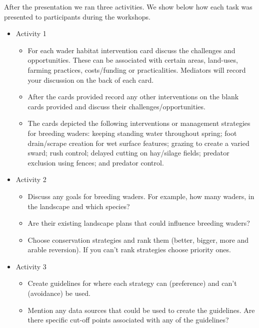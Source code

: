 \documentclass[
  12pt,
  letterpaper,
  DIV=11,
  numbers=noendperiod]{scrartcl}
\providecommand{\tightlist}{%
  \setlength{\itemsep}{0pt}\setlength{\parskip}{0pt}}\usepackage{longtable,booktabs,array}
\begin{document}
After the presentation we ran three activities. We show below how each
task was presented to participants during the workshops.

\begin{itemize}
\tightlist
\item
  Activity 1

  \begin{itemize}
  \tightlist
  \item
    For each wader habitat intervention card discuss the challenges and
    opportunities. These can be associated with certain areas,
    land-uses, farming practices, costs/funding or practicalities.
    Mediators will record your discussion on the back of each card.
  \item
    After the cards provided record any other interventions on the blank
    cards provided and discuss their challenges/opportunities.
  \item
    The cards depicted the following interventions or management
    strategies for breeding waders: keeping standing water throughout
    spring; foot drain/scrape creation for wet surface features; grazing
    to create a varied sward; rush control; delayed cutting on
    hay/silage fields; predator exclusion using fences; and predator
    control.
  \end{itemize}
\item
  Activity 2

  \begin{itemize}
  \tightlist
  \item
    Discuss any goals for breeding waders. For example, how many waders,
    in the landscape and which species?
  \item
    Are their existing landscape plans that could influence breeding
    waders?
  \item
    Choose conservation strategies and rank them (better, bigger, more
    and arable reversion). If you can't rank strategies choose priority
    ones.
  \end{itemize}
\item
  Activity 3

  \begin{itemize}
  \tightlist
  \item
    Create guidelines for where each strategy can (preference) and can't
    (avoidance) be used.
  \item
    Mention any data sources that could be used to create the
    guidelines. Are there specific cut-off points associated with any of
    the guidelines?
  \end{itemize}
\end{itemize}
\end{document}
